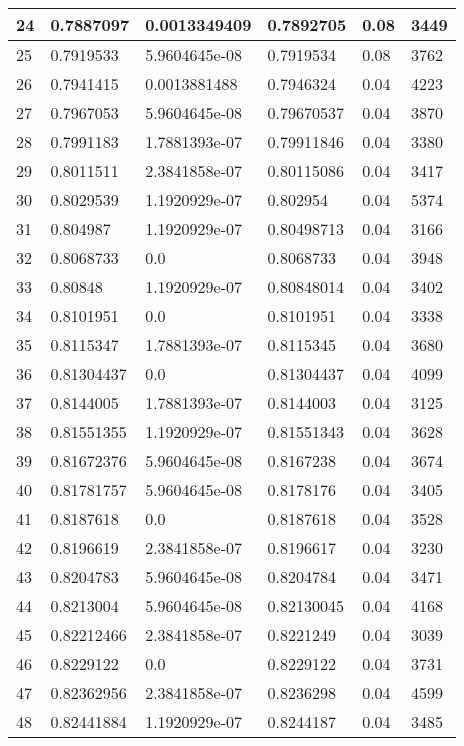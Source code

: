 \begin{longtable}{|l|l|l|l|l|l|}
24 & 0.7887097 & 0.0013349409 & 0.7892705 & 0.08 & 3449 \\ \hline 
25 & 0.7919533 & 5.9604645e-08 & 0.7919534 & 0.08 & 3762 \\ \hline 
26 & 0.7941415 & 0.0013881488 & 0.7946324 & 0.04 & 4223 \\ \hline 
27 & 0.7967053 & 5.9604645e-08 & 0.79670537 & 0.04 & 3870 \\ \hline 
28 & 0.7991183 & 1.7881393e-07 & 0.79911846 & 0.04 & 3380 \\ \hline 
29 & 0.8011511 & 2.3841858e-07 & 0.80115086 & 0.04 & 3417 \\ \hline 
30 & 0.8029539 & 1.1920929e-07 & 0.802954 & 0.04 & 5374 \\ \hline 
31 & 0.804987 & 1.1920929e-07 & 0.80498713 & 0.04 & 3166 \\ \hline 
32 & 0.8068733 & 0.0 & 0.8068733 & 0.04 & 3948 \\ \hline 
33 & 0.80848 & 1.1920929e-07 & 0.80848014 & 0.04 & 3402 \\ \hline 
34 & 0.8101951 & 0.0 & 0.8101951 & 0.04 & 3338 \\ \hline 
35 & 0.8115347 & 1.7881393e-07 & 0.8115345 & 0.04 & 3680 \\ \hline 
36 & 0.81304437 & 0.0 & 0.81304437 & 0.04 & 4099 \\ \hline 
37 & 0.8144005 & 1.7881393e-07 & 0.8144003 & 0.04 & 3125 \\ \hline 
38 & 0.81551355 & 1.1920929e-07 & 0.81551343 & 0.04 & 3628 \\ \hline 
39 & 0.81672376 & 5.9604645e-08 & 0.8167238 & 0.04 & 3674 \\ \hline 
40 & 0.81781757 & 5.9604645e-08 & 0.8178176 & 0.04 & 3405 \\ \hline 
41 & 0.8187618 & 0.0 & 0.8187618 & 0.04 & 3528 \\ \hline 
42 & 0.8196619 & 2.3841858e-07 & 0.8196617 & 0.04 & 3230 \\ \hline 
43 & 0.8204783 & 5.9604645e-08 & 0.8204784 & 0.04 & 3471 \\ \hline 
44 & 0.8213004 & 5.9604645e-08 & 0.82130045 & 0.04 & 4168 \\ \hline 
45 & 0.82212466 & 2.3841858e-07 & 0.8221249 & 0.04 & 3039 \\ \hline 
46 & 0.8229122 & 0.0 & 0.8229122 & 0.04 & 3731 \\ \hline 
47 & 0.82362956 & 2.3841858e-07 & 0.8236298 & 0.04 & 4599 \\ \hline 
48 & 0.82441884 & 1.1920929e-07 & 0.8244187 & 0.04 & 3485 \\ \hline 

\end{longtable}
